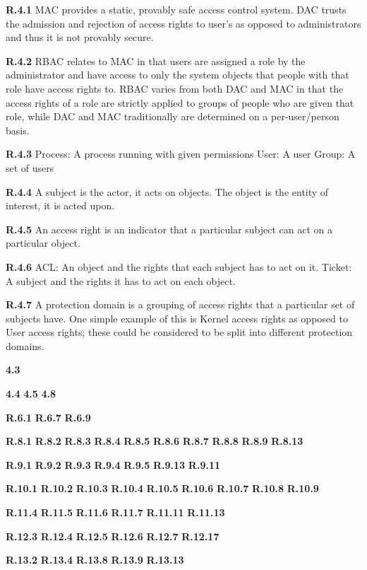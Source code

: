 \documentclass{report}
\begin{document}
{\bf R.4.1} MAC provides a static, provably safe access control system. DAC
trusts the admission and rejection of access rights to user's as opposed to
administrators and thus it is not provably secure.

{\bf R.4.2} RBAC relates to MAC in that users are assigned a role by the
administrator and have access to only the system objects that people with that
role have access rights to. RBAC varies from both DAC and MAC in that the access
rights of a role are strictly applied to groups of people who are given that
role, while DAC and MAC traditionally are determined on a per-user/person basis.

{\bf R.4.3} 
Process: A process running with given permissions
User: A user
Group: A set of users

{\bf R.4.4} A subject is the actor, it acts on objects. The object is the entity
of interest, it is acted upon.

{\bf R.4.5} An access right is an indicator that a particular subject can act on
a particular object.

{\bf R.4.6}
ACL: An object and the rights that each subject has to act on it.
Ticket: A subject and the rights it has to act on each object.

{\bf R.4.7}
A protection domain is a grouping of access rights that a particular set of
subjects have. One simple example of this is Kernel access rights as opposed to
User access rights; these could be considered to be split into different
protection domains.

{\bf 4.3}


{\bf 4.4}
{\bf 4.5}
{\bf 4.8}

{\bf R.6.1} 
{\bf R.6.7} 
{\bf R.6.9} 



{\bf R.8.1}
{\bf R.8.2}
{\bf R.8.3}
{\bf R.8.4}
{\bf R.8.5}
{\bf R.8.6}
{\bf R.8.7}
{\bf R.8.8}
{\bf R.8.9}
{\bf R.8.13}



{\bf R.9.1}
{\bf R.9.2}
{\bf R.9.3}
{\bf R.9.4}
{\bf R.9.5}
{\bf R.9.13}
{\bf R.9.11}



{\bf R.10.1}
{\bf R.10.2}
{\bf R.10.3}
{\bf R.10.4}
{\bf R.10.5}
{\bf R.10.6}
{\bf R.10.7}
{\bf R.10.8}
{\bf R.10.9}



{\bf R.11.4}
{\bf R.11.5}
{\bf R.11.6}
{\bf R.11.7}
{\bf R.11.11}
{\bf R.11.13}



{\bf R.12.3}
{\bf R.12.4}
{\bf R.12.5}
{\bf R.12.6}
{\bf R.12.7}
{\bf R.12.17}


{\bf R.13.2}
{\bf R.13.4}
{\bf R.13.8}
{\bf R.13.9}
{\bf R.13.13}
\end{document}
